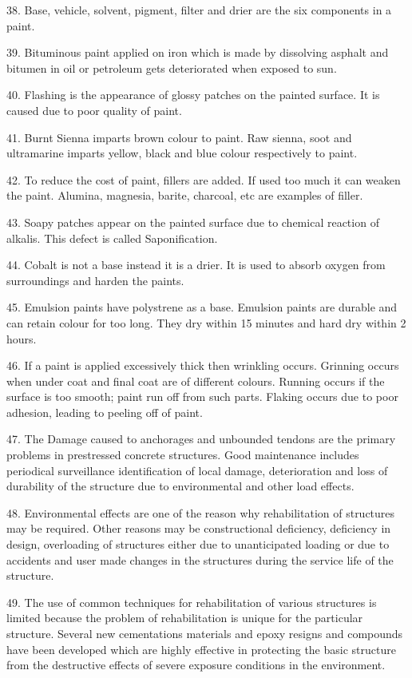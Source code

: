 \documentclass[11pt,a4paper]{article}
\begin{document}
38.
Base, vehicle, solvent, pigment, filter and drier are the six components in a paint.

39.
Bituminous paint applied on iron which is made by dissolving asphalt and bitumen in oil or petroleum gets deteriorated when exposed to sun.

40.
Flashing is the appearance of glossy patches on the painted surface. It is caused due to poor quality of paint.

41.
Burnt Sienna imparts brown colour to paint. Raw sienna, soot and ultramarine imparts yellow, black and blue colour respectively to paint.

42.
To reduce the cost of paint, fillers are added. If used too much it can weaken the paint. Alumina, magnesia, barite, charcoal, etc are examples of filler.
 
43.
Soapy patches appear on the painted surface due to chemical reaction of alkalis. This defect is called Saponification.

44.
Cobalt is not a base instead it is a drier. It is used to absorb oxygen from surroundings and harden the paints.

45.
Emulsion paints have polystrene as a base. Emulsion paints are durable and can retain colour for too long. They dry within 15 minutes and hard dry within 2 hours.

46.
If a paint is applied excessively thick then wrinkling occurs. Grinning occurs when under coat and final coat are of different colours. Running occurs if the surface is too smooth; paint run off from such parts. Flaking occurs due to poor adhesion, leading to peeling off of paint.

47.
 The Damage caused to anchorages and unbounded tendons are the primary problems in prestressed concrete structures. Good maintenance includes periodical surveillance identification of local damage, deterioration and loss of durability of the structure due to environmental and other load effects.

48.
Environmental effects are one of the reason why rehabilitation of structures may be required. Other reasons may be constructional deficiency, deficiency in design, overloading of structures either due to unanticipated loading or due to accidents and user made changes in the structures during the service life of the structure.

49.
The use of common techniques for rehabilitation of various structures is limited because the problem of rehabilitation is unique for the particular structure. Several new cementations materials and epoxy resigns and compounds have been developed which are highly effective in protecting the basic structure from the destructive effects of severe exposure conditions in the environment.
\end{document}

